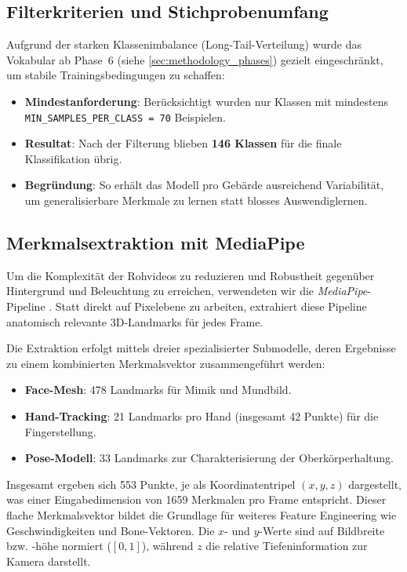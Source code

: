 \subsection{Filterkriterien und Stichprobenumfang}
Aufgrund der starken Klassenimbalance (Long-Tail-Verteilung) wurde das Vokabular ab Phase~6 (siehe \autoref{sec:methodology_phases}) gezielt eingeschränkt, um stabile Trainingsbedingungen zu schaffen:

\begin{itemize}
    \item \textbf{Mindestanforderung}: Berücksichtigt wurden nur Klassen mit mindestens \texttt{MIN\_SAMPLES\_PER\_CLASS = 70} Beispielen.
    \item \textbf{Resultat}: Nach der Filterung blieben \textbf{146 Klassen} für die finale Klassifikation übrig.
    \item \textbf{Begründung}: So erhält das Modell pro Gebärde ausreichend Variabilität, um generalisierbare Merkmale zu lernen statt blosses Auswendiglernen.
\end{itemize}

\subsection{Merkmalsextraktion mit MediaPipe}
Um die Komplexität der Rohvideos zu reduzieren und Robustheit gegenüber Hintergrund und Beleuchtung zu erreichen, verwendeten wir die \textit{MediaPipe}-Pipeline \cite{lugaresi2019}. Statt direkt auf Pixelebene zu arbeiten, extrahiert diese Pipeline anatomisch relevante 3D-Landmarks für jedes Frame.

Die Extraktion erfolgt mittels dreier spezialisierter Submodelle, deren Ergebnisse zu einem kombinierten Merkmalsvektor zusammengeführt werden:

\begin{itemize}
    \item \textbf{Face-Mesh}: 478 Landmarks für Mimik und Mundbild.
    \item \textbf{Hand-Tracking}: 21 Landmarks pro Hand (insgesamt 42 Punkte) für die Fingerstellung.
    \item \textbf{Pose-Modell}: 33 Landmarks zur Charakterisierung der Oberkörperhaltung.
\end{itemize}

Insgesamt ergeben sich 553 Punkte, je als Koordinatentripel $(x,y,z)$ dargestellt, was einer Eingabedimension von 1659 Merkmalen pro Frame entspricht. Dieser flache Merkmalsvektor bildet die Grundlage für weiteres Feature Engineering wie Geschwindigkeiten und Bone-Vektoren. Die $x$- und $y$-Werte sind auf Bildbreite bzw. -höhe normiert ($[0,1]$), während $z$ die relative Tiefeninformation zur Kamera darstellt.

